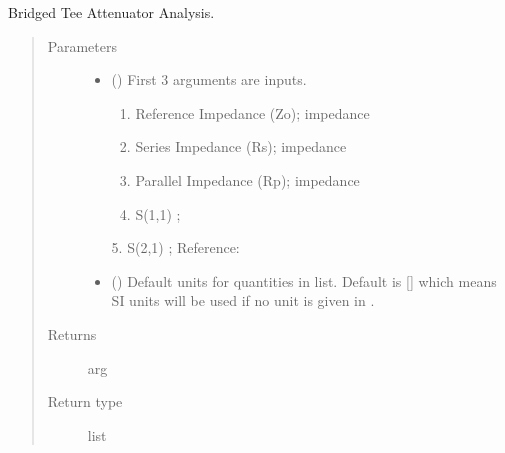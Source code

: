 \documentclass[letterpaper,10pt,english]{sphinxmanual}
\begin{document}

\begin{fulllineitems}
\label{\detokenize{components:components.Bridged_Tee_Attenuator_Analysis}}
Bridged Tee Attenuator Analysis.
\begin{quote}\begin{description}
\item[{Parameters}] \leavevmode\begin{itemize}
\item {} 
 () \textendash{} 
First 3 arguments are inputs.
\begin{enumerate}
%
\item {} 
Reference Impedance (Zo); impedance

\item {} 
Series Impedance (Rs); impedance

\item {} 
Parallel Impedance (Rp); impedance

\item {} 
S(1,1) ;

\end{enumerate}

5. S(2,1) ;
Reference:


\item {} 
 (\sphinxstyleliteralemphasis{\sphinxupquote{, }}) \textendash{} Default units for quantities in  list. Default is {[}{]} which means SI units will be used if no unit is given in .

\end{itemize}

\item[{Returns}] \leavevmode
arg

\item[{Return type}] \leavevmode
list

\end{description}\end{quote}

\end{fulllineitems}
\end{document}

